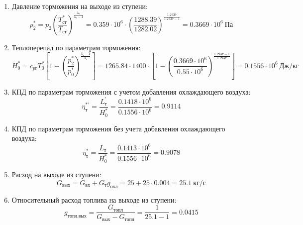 \documentclass[a4paper,10pt]{article}
\begin{document}
\begin{enumerate}
        \item Давление торможения на выходе из ступени:
        \[
            p_2^* = p_2 \left(
                            \frac{ T_{ст}^* }{ T_{ст} }
                    \right) ^ \frac{ k_г }{ k_г - 1 } =
                 0.359 \cdot 10^6 \cdot \left(
                            \frac{ 1288.39 }{ 1282.02 }
                    \right) ^
                \frac{ 1.2937 }{ 1.2937 - 1 } =
            0.3669 \cdot 10^6 \ Па
        \]

        \item Теплоперепад по параметрам торможения:
        \[
            H_0^* = c_{pг} T_0^* \left[
                        1 - \left(
                                \frac{p_2^*}{p_0^*}
                            \right) ^
                        \frac{k_г - 1}{k_г}
                    \right] =
            1265.84 \cdot 1400 \cdot
                    \left[
                        1 - \left(
                                \frac{
                                    0.3669 \cdot 10^6
                                }{
                                    0.55 \cdot 10^6
                                }
                            \right) ^
                        \frac{1.2937 - 1}{1.2937}
                    \right] =
            0.1556 \cdot 10^6 \ Дж/кг
        \]

        \item КПД по параметрам торможения с учетом добавления охлаждающего воздуха:
        \[
            \eta_т^{*\prime} = \frac{ L_т^\prime }{ H_0^* } =
                \frac{
                    0.1418 \cdot 10^6
                }{
                    0.1556 \cdot 10^6 } =
            0.9114
        \]

        \item КПД по параметрам торможения без учета добавления охлаждающего воздуха:
        \[
            \eta_т^* = \frac{ L_т }{ H_0^* } =
                \frac{
                    0.1413 \cdot 10^6
                }{
                    0.1556 \cdot 10^6 } =
            0.9078
        \]

        \item Расход на выходе из ступени:
        \[
            G_{вых} = G_{вх} + G_т g_{охл} =
                25 + 25 \cdot
                0.004 =
            25.1 \ кг/с
        \]

        \item Относительный расход топлива на выходе из ступени:
        \[
            g_{топл.вых} = \frac{ G_{топл} }{ G_{вых} - G_{топл} } =
                 \frac{ 1 }{ 25.1 - 1 } =
            0.0415
        \]


\end{enumerate}
\end{document}
